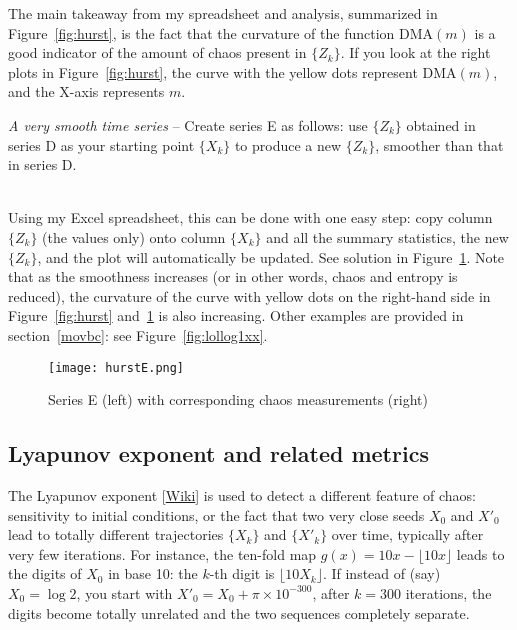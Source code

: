 \documentclass[oneside,10pt]{book}
\begin{document}
The main takeaway from my spreadsheet and analysis, summarized in Figure~\ref{fig:hurst}, is the fact that the curvature
 of the function $\text{DMA}(m)$ is a good indicator of the amount of chaos present in $\{Z_k\}$. If you look at the right plots in Figure~\ref{fig:hurst}, the curve with the yellow dots represent $\text{DMA}(m)$, and the X-axis represents $m$.




\begin{Exercise} {\em A very smooth time series} -- Create series E as follows: use $\{Z_k\}$ obtained in series D as your starting point $\{X_k\}$ to produce a new $\{Z_k\}$, smoother than that  in series D. \vspace{1ex}

 \\
Using my Excel spreadsheet, this can be done with one easy step: copy column $\{Z_k\}$ (the values only) onto column $\{X_k\}$ and all the summary
 statistics, the new $\{Z_k\}$, and the plot will automatically be updated. See solution in Figure~\ref{fig:hurst2}. Note that as the smoothness
 increases (or in other words, chaos and entropy is reduced), the curvature of  the curve with yellow dots on the right-hand side in Figure~\ref{fig:hurst} and~\ref{fig:hurst2} is also increasing. Other examples are provided in section~\ref{movbc}: see Figure~\ref{fig:lollog1xx}.
\end{Exercise}

\begin{figure}[H]
\centering
\texttt{[image: hurstE.png]}  %
\caption{Series E (left) with corresponding chaos measurements (right)}
\label{fig:hurst2}
\end{figure}

\subsection{Lyapunov exponent and related metrics}\label{fredur}

The \textcolor{index}{Lyapunov exponent} [\href{https://en.wikipedia.org/wiki/Lyapunov_exponent}{Wiki}] is used to detect a different feature of chaos: sensitivity to initial conditions, or the fact that
  two very close seeds $X_0$ and $X'_0$ lead to totally different trajectories $\{X_k\}$ and $\{X'_k\}$ over time, typically after
 very few iterations. For instance, the \textcolor{index}{ten-fold map} $g(x)=10 x - \lfloor 10 x\rfloor$ leads to the digits of $X_0$ in base 10: the $k$-th digit is $\lfloor 10 X_k\rfloor$. If instead of (say) $X_0=\log 2$, you start with $X'_0 = X_0 + \pi \times 10^{-300}$, after $k=300$ iterations, the digits become totally unrelated and the two sequences completely separate.
\end{document}
